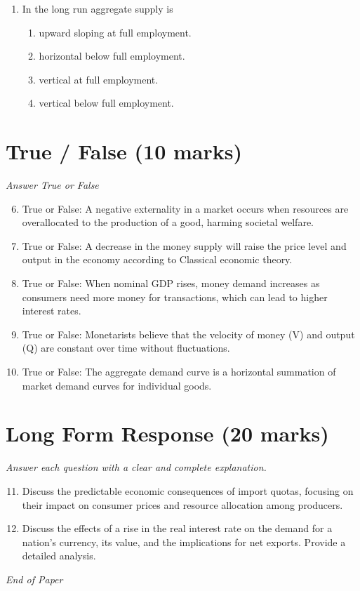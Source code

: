 \documentclass[12pt]{article}
\begin{document}
\begin{enumerate}[label=\arabic*.]
\begin{enumerate}[label=(\alph*)]
    \item Private property.
    \item Central planners set wages and prices.
\end{enumerate}
\item In the long run aggregate supply is
\begin{enumerate}[label=(\alph*)]
    \item upward sloping at full employment.
    \item horizontal below full employment.
    \item vertical at full employment.
    \item vertical below full employment.
\end{enumerate}
\end{enumerate}

\section*{True / False (10 marks)}
\textit{Answer True or False}
\begin{enumerate}[label=\arabic*.]
\setcounter{enumi}{5}
\item True or False: A negative externality in a market occurs when resources are overallocated to the production of a good, harming societal welfare.
\item True or False: A decrease in the money supply will raise the price level and output in the economy according to Classical economic theory.
\item True or False: When nominal GDP rises, money demand increases as consumers need more money for transactions, which can lead to higher interest rates.
\item True or False: Monetarists believe that the velocity of money (V) and output (Q) are constant over time without fluctuations.
\item True or False: The aggregate demand curve is a horizontal summation of market demand curves for individual goods.
\end{enumerate}

\section*{Long Form Response (20 marks)}
\textit{Answer each question with a clear and complete explanation.}
\begin{enumerate}[label=\arabic*.]
\setcounter{enumi}{10}
\item Discuss the predictable economic consequences of import quotas, focusing on their impact on consumer prices and resource allocation among producers.
\item Discuss the effects of a rise in the real interest rate on the demand for a nation's currency, its value, and the implications for net exports. Provide a detailed analysis.
\end{enumerate}

\vfill
\noindent\textit{End of Paper}
\end{document}
